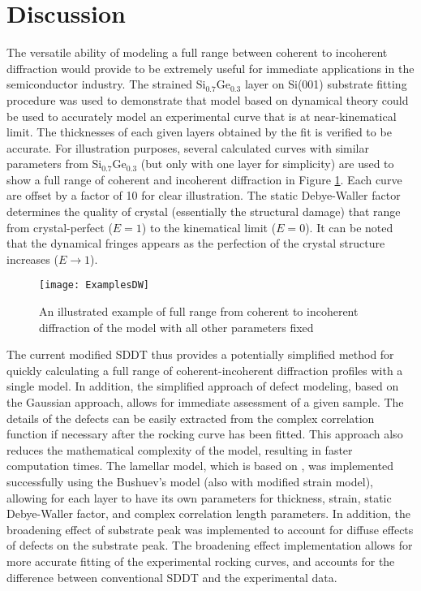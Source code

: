 	\section{Discussion}

The versatile ability of modeling a full range between coherent to incoherent diffraction would provide to be extremely useful for immediate applications in the semiconductor industry.  The strained Si$_{0.7}$Ge$_{0.3}$ layer on Si(001) substrate fitting procedure was used to demonstrate that model based on dynamical theory could be used to accurately model an experimental curve that is at near-kinematical limit.  The thicknesses of each given layers obtained by the fit is verified to be accurate.  For illustration purposes, several calculated curves with similar parameters from Si$_{0.7}$Ge$_{0.3}$ (but only with one layer for simplicity) are used to show a full range of coherent and incoherent diffraction in Figure \ref{example}.  Each curve are offset by a factor of 10 for clear illustration.  The static Debye-Waller factor determines the quality of crystal (essentially the structural damage) that range from crystal-perfect ($E=1$) to the kinematical limit ($E=0$).  It can be noted that the dynamical fringes appears as the perfection of the crystal structure increases ($E \rightarrow 1$).
%
\begin{figure}
	\texttt{[image: ExamplesDW]}
	\caption{An illustrated example of full range from coherent to incoherent diffraction of the model with all other parameters fixed}
	\label{example}
	\end{figure}
%
The current modified SDDT thus provides a potentially simplified method for quickly calculating a full range of coherent-incoherent diffraction profiles with a single model.  In addition, the simplified approach of defect modeling, based on the Gaussian approach, allows for immediate assessment of a given sample.  The details of the defects can be easily extracted from the complex correlation function if necessary after the rocking curve has been fitted.  This approach also reduces the mathematical complexity of the model, resulting in faster computation times.  The lamellar model, which is based on \cite{Punegov15}, was implemented successfully using the Bushuev's model \cite{Bushuev1,Bushuev2} (also with modified strain model), allowing for each layer to have its own parameters for thickness, strain, static Debye-Waller factor, and complex correlation length parameters.  In addition, the broadening effect of substrate peak was implemented  to account for diffuse effects of defects on the substrate peak.  The broadening effect implementation allows for more accurate fitting of the experimental rocking curves, and accounts for the difference between conventional SDDT and the experimental data.  


